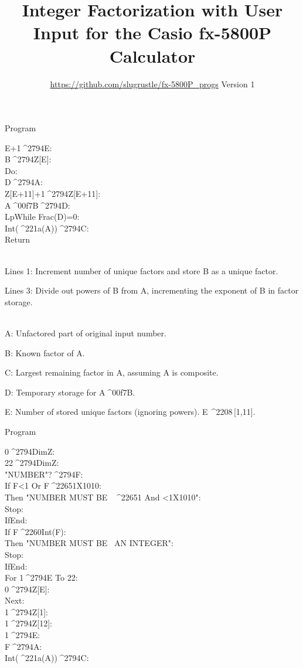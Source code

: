 \documentclass[11pt,letterpaper]{article}
\date{}
\newcommand{\STO}{{\large ^^^^2794}}
\newcommand{\NEQ}{^^^^2260}
\newcommand{\GEQ}{^^^^2265}
\newcommand{\DIV}{^^^^00f7}
\newcommand{\EXPTEN}{{\scriptsize X10}}
\newcommand{\SQRT}{^^^^221a}
\newcommand{\ELEM}{^^^^2208}
\newcommand{\IDENT}[1]{\hspace*{#1\BaseIndent}}
\begin{document}
\title{Integer Factorization with User Input for the Casio fx-5800P Calculator}
\author{\url{https://github.com/slugrustle/fx-5800P_progs} \quad Version 1}
\maketitle
\thispagestyle{fancy}
\begin{multicols}{2}
Program 

\begin{linenumbers}[1]
E+1\STO E:\\
B\STO Z[E]:\\
Do:\\
\IDENT{1}D\STO A:\\
\IDENT{1}Z[E+11]+1\STO Z[E+11]:\\
\IDENT{1}A\DIV B\STO D:\\
LpWhile Frac(D)=0:\\
Int(\SQRT(A))\STO C:\\
Return
\end{linenumbers}

\\
Lines 1: Increment number of unique factors and store B as a unique factor.

Lines 3: Divide out powers of B from A, incrementing the exponent of B in factor storage.

\\
A: Unfactored part of original input number.

B: Known factor of A.

C: Largest remaining factor in A, assuming A is composite.

D: Temporary storage for A\DIV B.

E: Number of stored unique factors (ignoring powers). E\,\ELEM \,[1,11].
\vspace{3ex}

Program 

\begin{linenumbers}[1]
0\STO DimZ:\\
22\STO DimZ:\\
"NUMBER"?\STO F:\\
If F<1 Or F\GEQ 1\EXPTEN 10:\\
\IDENT{1}Then "NUMBER MUST BE ~\GEQ 1 And <1\EXPTEN 10":\\
\IDENT{1}Stop:\\
IfEnd:\\
If F\NEQ Int(F):\\
\IDENT{1}Then "NUMBER MUST BE ~AN INTEGER":\\
\IDENT{1}Stop:\\
IfEnd:\\
For 1\STO E To 22:\\
\IDENT{1}0\STO Z[E]:\\
Next:\\
1\STO Z[1]:\\
1\STO Z[12]:\\
1\STO E:\\
F\STO A:\\
Int(\SQRT (A))\STO C:
\end{linenumbers}
\end{multicols}
\end{document}
